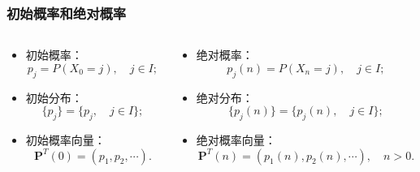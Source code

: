 \begin{frame}
    \frametitle{初始概率和绝对概率}
    \begin{columns}
        \begin{column}{.45\linewidth}
            \begin{mydefinition}
                \begin{itemize}
                    \item 初始概率：
                    \begin{equation*}
                        p_j=P(X_0=j),\quad j\in I;
                    \end{equation*}
                    \item 初始分布：
                    \begin{equation*}
                        \{p_j\}=\{p_j,\quad j\in I\};
                    \end{equation*}
                    \item 初始概率向量：
                    \begin{equation*}
                        \bm P^T(0)=(p_1,p_2,\cdots).
                    \end{equation*}
                \end{itemize}
            \end{mydefinition}
        \end{column}
        \begin{column}{.45\linewidth}
            \begin{mydefinition}
                \begin{itemize}
                    \item 绝对概率：
                    \begin{equation*}
                        p_j(n)=P(X_n=j),\quad j\in I;
                    \end{equation*}
                    \item 绝对分布：
                    \begin{equation*}
                        \{p_j(n)\}=\{p_j(n),\quad j\in I\};
                    \end{equation*}
                    \item 绝对概率向量：
                    \begin{equation*}
                        \bm P^T(n)=(p_1(n),p_2(n),\cdots),\quad n>0.
                    \end{equation*}
                \end{itemize}
            \end{mydefinition}
        \end{column}        
    \end{columns}
\end{frame}

